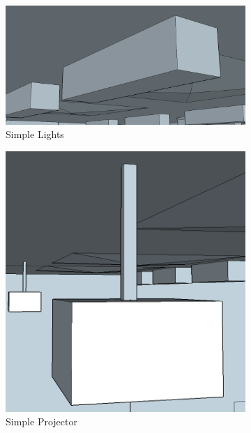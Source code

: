 \documentclass[../../main.tex]{subfiles}
\begin{document}
			\begin{figure}[ht]
				\begin{subfigure}[t]{4in}
					\centering
					\includegraphics[scale = 0.25]{Sections/Implementation/Modelling/images/lightsSimple.png}
					\caption{Simple Lights}
				\end{subfigure}
				\begin{subfigure}[t]{3in}
					\centering
					\includegraphics[scale = 0.25]{Sections/Implementation/Modelling/images/projectorSimple.png}
					\caption{Simple Projector}
				\end{subfigure}
				\begin{subfigure}[t]{3in}

\end{subfigure}
\end{figure}
\end{document}
